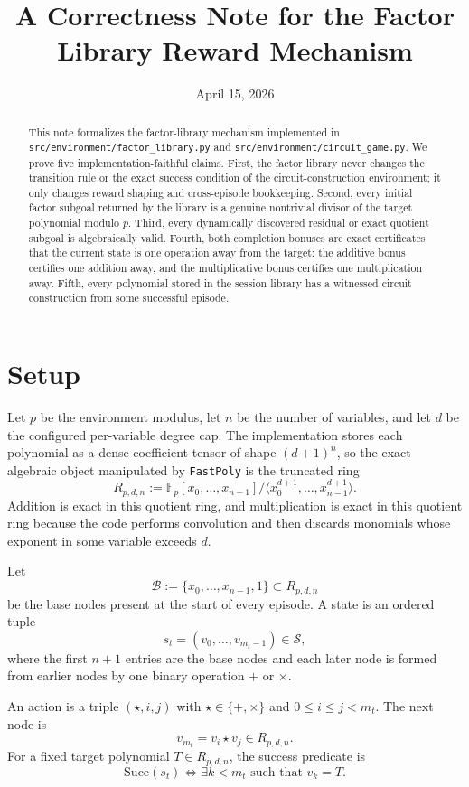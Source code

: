 \documentclass[11pt]{article}
\title{A Correctness Note for the Factor Library Reward Mechanism}
\author{}
\date{April 15, 2026}
\theoremstyle{remark}
\newcommand{\Fp}{\mathbb{F}_p}
\newcommand{\B}{\mathcal{B}}
\newcommand{\States}{\mathcal{S}}
\begin{document}
\maketitle

\begin{abstract}
This note formalizes the factor-library mechanism implemented in
\texttt{src/environment/factor\_library.py} and
\texttt{src/environment/circuit\_game.py}. We prove five implementation-faithful
claims. First, the factor library never changes the transition rule or the exact
success condition of the circuit-construction environment; it only changes
reward shaping and cross-episode bookkeeping. Second, every initial factor
subgoal returned by the library is a genuine nontrivial divisor of the target
polynomial modulo $p$. Third, every dynamically discovered residual or exact
quotient subgoal is algebraically valid. Fourth, both completion bonuses are
exact certificates that the current state is one operation away from the target:
the additive bonus certifies one addition away, and the multiplicative bonus
certifies one multiplication away. Fifth, every polynomial stored in the session
library has a witnessed circuit construction from some successful episode.
\end{abstract}

\section{Setup}

Let $p$ be the environment modulus, let $n$ be the number of variables, and let
$d$ be the configured per-variable degree cap. The implementation stores each
polynomial as a dense coefficient tensor of shape $(d+1)^n$, so the exact
algebraic object manipulated by \texttt{FastPoly} is the truncated ring
\[
R_{p,d,n}
:=
\Fp[x_0,\dots,x_{n-1}]
\big/
\langle x_0^{d+1},\dots,x_{n-1}^{d+1}\rangle.
\]
Addition is exact in this quotient ring, and multiplication is exact in this
quotient ring because the code performs convolution and then discards monomials
whose exponent in some variable exceeds $d$.

Let
\[
\B := \{x_0,\dots,x_{n-1},1\} \subset R_{p,d,n}
\]
be the base nodes present at the start of every episode. A state is an ordered
tuple
\[
s_t = (v_0,\dots,v_{m_t-1}) \in \States,
\]
where the first $n+1$ entries are the base nodes and each later node is formed
from earlier nodes by one binary operation $+$ or $\times$.

An action is a triple $(\star,i,j)$ with $\star \in \{+,\times\}$ and
$0 \le i \le j < m_t$. The next node is
\[
v_{m_t} = v_i \star v_j \in R_{p,d,n}.
\]
For a fixed target polynomial $T \in R_{p,d,n}$, the success predicate is
\[
\mathrm{Succ}(s_t) \iff \exists k < m_t \text{ such that } v_k = T.
\]
\end{document}
